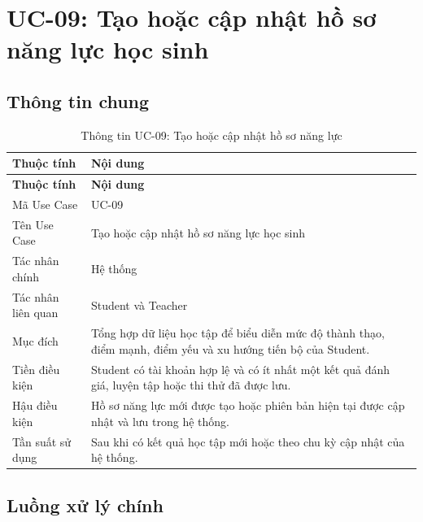 \section{UC-09: Tạo hoặc cập nhật hồ sơ năng lực học sinh}
\label{sec:uc09-learning-profile}

\subsection{Thông tin chung}

\begin{longtable}{|p{4.2cm}|p{10.2cm}|}
	\caption{Thông tin UC-09: Tạo hoặc cập nhật hồ sơ năng lực}
	\label{tab:uc09-info}\\
	\hline
	\textbf{Thuộc tính} & \textbf{Nội dung} \\
	\hline
	\endfirsthead
	
	\hline
	\textbf{Thuộc tính} & \textbf{Nội dung} \\
	\hline
	\endhead
	
	Mã Use Case &
	UC-09 \\
	\hline
	
	Tên Use Case &
	Tạo hoặc cập nhật hồ sơ năng lực học sinh \\
	\hline
	
	Tác nhân chính &
	Hệ thống \\
	\hline
	
	Tác nhân liên quan &
	Student và Teacher \\
	\hline
	
	Mục đích &
	Tổng hợp dữ liệu học tập để biểu diễn mức độ thành thạo, điểm mạnh,
	điểm yếu và xu hướng tiến bộ của Student. \\
	\hline
	
	Tiền điều kiện &
	Student có tài khoản hợp lệ và có ít nhất một kết quả đánh giá, luyện
	tập hoặc thi thử đã được lưu. \\
	\hline
	
	Hậu điều kiện &
	Hồ sơ năng lực mới được tạo hoặc phiên bản hiện tại được cập nhật và lưu
	trong hệ thống. \\
	\hline
	
	Tần suất sử dụng &
	Sau khi có kết quả học tập mới hoặc theo chu kỳ cập nhật của hệ thống. \\
	\hline
	
\end{longtable}

\subsection{Luồng xử lý chính}

